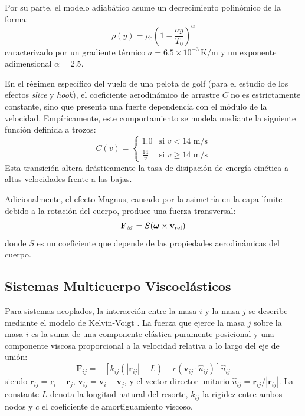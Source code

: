 Por su parte, el modelo adiabático asume un decrecimiento polinómico de la forma:
\begin{equation}
    \rho(y) = \rho_0 \left( 1 - \frac{a y}{T_0} \right)^\alpha
\end{equation}
caracterizado por un gradiente térmico $a = 6.5 \times 10^{-3}\mathrm{\,K/m}$ y un exponente adimensional $\alpha = 2.5$.

En el régimen específico del vuelo de una pelota de golf (para el estudio de los efectos \textit{slice} y \textit{hook}), el coeficiente aerodinámico de arrastre $C$ no es estrictamente constante, sino que presenta una fuerte dependencia con el módulo de la velocidad. Empíricamente, este comportamiento se modela mediante la siguiente función definida a trozos:
\begin{equation}
    C(v) =
    \begin{cases}
        1.0 & \text{si } v < 14 \text{ m/s} \\
        \frac{14}{v} & \text{si } v \geq 14 \text{ m/s}
    \end{cases}
    \label{eq:coef_arrastre}
\end{equation}
Esta transición altera drásticamente la tasa de disipación de energía cinética a altas velocidades frente a las bajas. 

Adicionalmente, el efecto Magnus, causado por la asimetría en la capa límite debido a la rotación del cuerpo, produce una fuerza transversal:
\begin{equation}
    \mathbf{F}_M = S (\boldsymbol{\omega} \times \mathbf{v}_{\rm rel})
\end{equation}
donde $S$ es un coeficiente que depende de las propiedades aerodinámicas del cuerpo.

\subsection{Sistemas Multicuerpo Viscoelásticos}
Para sistemas acoplados, la interacción entre la masa $i$ y la masa $j$ se describe mediante el modelo de Kelvin-Voigt \citep{viscous}. La fuerza que ejerce la masa $j$ sobre la masa $i$ es la suma de una componente elástica puramente posicional y una componente viscosa proporcional a la velocidad relativa a lo largo del eje de unión:
\begin{equation}
    \mathbf{F}_{ij} = - \left[ k_{ij} (|\mathbf{r}_{ij}| - L) + c \left( \mathbf{v}_{ij} \cdot \hat{u}_{ij} \right) \right] \hat{u}_{ij}
\end{equation}
siendo $\mathbf{r}_{ij} = \mathbf{r}_i - \mathbf{r}_j$, $\mathbf{v}_{ij} = \mathbf{v}_i - \mathbf{v}_j$, y el vector director unitario $\hat{u}_{ij} = \mathbf{r}_{ij}/|\mathbf{r}_{ij}|$. La constante $L$ denota la longitud natural del resorte, $k_{ij}$ la rigidez entre ambos nodos y $c$ el coeficiente de amortiguamiento viscoso.
